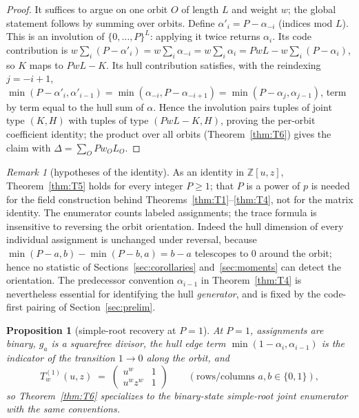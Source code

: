 \documentclass[10pt,journal,draftclsnofoot,onecolumn]{IEEEtran}
\newtheorem{proposition}[theorem]{Proposition}
\theoremstyle{definition}
\theoremstyle{remark}
\newtheorem*{remark}{Remark}
\newcommand{\Z}{\mathbb{Z}}
\begin{document}
\begin{proof}
It suffices to argue on one orbit \(O\) of length \(L\) and weight \(w\);
the global statement follows by summing over orbits. Define
\(\alpha'_i = P - \alpha_{-i}\) (indices mod \(L\)). This is an
involution of \(\{0,\dots,P\}^L\): applying it twice returns
\(\alpha_i\). Its code contribution is
\(w \sum_i (P-\alpha'_i) = w \sum_i \alpha_{-i} = w \sum_i \alpha_i
= PwL - w\sum_i (P-\alpha_i)\), so \(K\) maps to \(PwL - K\). Its hull
contribution satisfies, with the reindexing \(j = -i+1\),
\(\min(P-\alpha'_i, \alpha'_{i-1}) = \min(\alpha_{-i}, P-\alpha_{-i+1})
= \min(P-\alpha_j, \alpha_{j-1})\),
term by term equal to the hull sum of \(\alpha\). Hence the involution
pairs tuples of joint type \((K,H)\) with tuples of type
\((PwL-K, H)\), proving the per-orbit coefficient identity; the product
over all orbits (Theorem~\ref{thm:T6}) gives the claim with
\(\Delta = \sum_O Pw_OL_O\).
\end{proof}

\begin{remark}[hypotheses of the identity]
As an identity in \(\Z[u,z]\), Theorem~\ref{thm:T5} holds for every
integer \(P \ge 1\); that \(P\) is a power of \(p\) is needed
for the field construction behind Theorems~\ref{thm:T1}--\ref{thm:T4},
not for the matrix identity. The enumerator counts labeled assignments;
the trace formula is insensitive to reversing the orbit orientation.
Indeed the hull dimension of every individual assignment is unchanged
under reversal, because
\(\min(P-a,b) - \min(P-b,a) = b - a\) telescopes to \(0\) around the
orbit; hence no statistic of Sections~\ref{sec:corollaries}
and~\ref{sec:moments} can detect the orientation. The predecessor
convention \(\alpha_{i-1}\) in Theorem~\ref{thm:T4} is nevertheless
essential for identifying the hull \emph{generator}, and is fixed by
the code-first pairing of Section~\ref{sec:prelim}.
\end{remark}

\begin{proposition}[simple-root recovery at \(P=1\)]\label{prop:P1}
At \(P = 1\), assignments are binary, \(g_a\) is a
squarefree divisor, the hull edge term \(\min(1-\alpha_i, \alpha_{i-1})\)
is the indicator of the transition \(1 \to 0\) along the orbit, and
\[
T^{(1)}_w(u,z) \;=\;
\begin{pmatrix} u^w & 1 \\ u^w z^w & 1 \end{pmatrix}
\qquad (\text{rows/columns } a,b \in \{0,1\}),
\]
so Theorem~\ref{thm:T6} specializes to the binary-state simple-root
joint enumerator with the same conventions.
\end{proposition}
\end{document}
